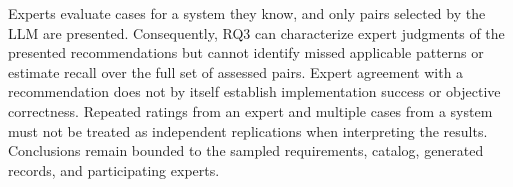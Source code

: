 Experts evaluate cases for a system they know, and only pairs selected by the
LLM are presented. Consequently, RQ3 can characterize expert judgments of the
presented recommendations but cannot identify missed applicable patterns or
estimate recall over the full set of assessed pairs. Expert agreement with a
recommendation does not by itself establish implementation success or objective
correctness. Repeated ratings from an expert and multiple cases from a system
must not be treated as independent replications when interpreting the results.
Conclusions remain bounded to the sampled requirements, catalog, generated
records, and participating experts.

%

